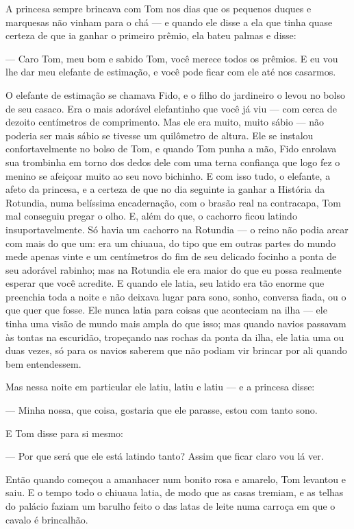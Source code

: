 A princesa sempre brincava com Tom nos dias que os pequenos duques e
marquesas não vinham para o chá — e quando ele disse a ela que tinha
quase certeza de que ia ganhar o primeiro prêmio, ela bateu palmas e
disse:

— Caro Tom, meu bom e sabido Tom, você merece todos os prêmios. E eu
vou lhe dar meu elefante de estimação, e você pode ficar com ele até
nos casarmos.

O elefante de estimação se chamava Fido, e o filho do jardineiro o
levou no bolso de seu casaco. Era o mais adorável elefantinho que
você já viu — com cerca de dezoito centímetros de comprimento. Mas
ele era muito, muito sábio — não poderia ser mais sábio se tivesse um
quilômetro de altura. Ele se instalou confortavelmente no bolso de
Tom, e quando Tom punha a mão, Fido enrolava sua trombinha em torno
dos dedos dele com uma terna confiança que logo fez o menino se
afeiçoar muito ao seu novo bichinho. E com isso tudo, o elefante, a
afeto da princesa, e a certeza de que no dia seguinte ia ganhar a
História da Rotundia, numa belíssima encadernação, com o brasão real
na contracapa, Tom mal conseguiu pregar o olho. E, além do que, o
cachorro ficou latindo insuportavelmente. Só havia um cachorro na
Rotundia — o reino não podia arcar com mais do que um: era um
chiuaua, do tipo que em outras partes do mundo mede apenas vinte e um
centímetros do fim de seu delicado focinho a ponta de seu adorável
rabinho; mas na Rotundia ele era maior do que eu possa realmente
esperar que você acredite. E quando ele latia, seu latido era tão
enorme que preenchia toda a noite e não deixava lugar para sono,
sonho, conversa fiada, ou o que quer que fosse. Ele nunca latia para
coisas que aconteciam na ilha — ele tinha uma visão de mundo mais
ampla do que isso; mas quando navios passavam às tontas na escuridão,
tropeçando nas rochas da ponta da ilha, ele latia uma ou duas vezes,
só para os navios saberem que não podiam vir brincar por ali quando
bem entendessem.

Mas nessa noite em particular ele latiu, latiu e latiu — e a princesa
disse:

— Minha nossa, que coisa, gostaria que ele parasse, estou com tanto
sono. 

E Tom disse para si mesmo:

— Por que será que ele está latindo tanto? Assim que ficar claro vou
lá ver.

Então quando começou a amanhacer num bonito rosa e amarelo, Tom
levantou e saiu. E o tempo todo o chiuaua latia, de modo que as casas
tremiam, e as telhas do palácio faziam um barulho feito o das latas
de leite numa carroça em que o cavalo é brincalhão.

